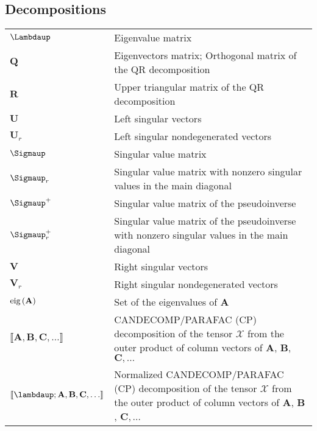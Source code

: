 \documentclass{article}
\newcommand{\eig}[1]{\ensuremath{\textnormal{eig}\left(#1\right)}} %
\begin{document}
\subsection{Decompositions}
\begin{xltabular}{\textwidth}{XX}
    \(\boldsymbol{\Lambdaup}\) & Eigenvalue matrix \\
    \(\mathbf{Q}\) & Eigenvectors matrix; Orthogonal matrix of the QR decomposition\\
    \(\mathbf{R}\) & Upper triangular matrix of the QR decomposition\\
    \(\mathbf{U}\) & Left singular vectors\\
    \(\mathbf{U}_r\) & Left singular nondegenerated vectors\\
    \(\boldsymbol{\Sigmaup}\) & Singular value matrix\\
    \(\boldsymbol{\Sigmaup}_r\) & Singular value matrix with nonzero singular values in the main diagonal\\
    \(\boldsymbol{\Sigmaup}^{+}\) & Singular value matrix of the pseudoinverse\\
    \(\boldsymbol{\Sigmaup}^{+}_r\) & Singular value matrix of the pseudoinverse with nonzero singular values in the main diagonal\\
    \(\mathbf{V}\) & Right singular vectors\\
    \(\mathbf{V}_r\) & Right singular nondegenerated vectors\\
    \(\eig{\mathbf{A}}\) & Set of the eigenvalues of \(\mathbf{A}\)\\
    \(\llbracket \mathbf{A}, \mathbf{B}, \mathbf{C}, \dots \rrbracket\) & CANDECOMP/PARAFAC (CP) decomposition of the tensor \(\bm{\mathcal{X}}\) from the outer product of column vectors of \(\mathbf{A}\), \(\mathbf{B}\), \(\mathbf{C}, \dots\)\\
    \(\llbracket \boldsymbol{\lambdaup}; \mathbf{A}, \mathbf{B}, \mathbf{C}, \dots \rrbracket\) & Normalized CANDECOMP/PARAFAC (CP) decomposition of the tensor \(\bm{\mathcal{X}}\) from the outer product of column vectors of \(\mathbf{A}\), \(\mathbf{B}\), \(\mathbf{C}, \dots\)\\
\end{xltabular}
\end{document}
